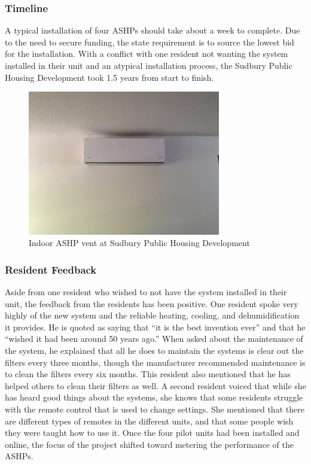 \subsubsection{Timeline}
\par A typical installation of four ASHPs should take about a week to complete. Due to the need to secure funding, the state requirement is to source the lowest bid for the installation. With a conflict with one resident not wanting the system installed in their unit and an atypical installation process, the Sudbury Public Housing Development took 1.5 years from start to finish.
\begin{figure}[H]
\centering
\includegraphics[width=0.75\textwidth]{findingschapter/sudburyinsideunit}
\caption{Indoor ASHP vent at Sudbury Public Housing Development}
\end{figure}

\subsubsection{Resident Feedback}
\par Aside from one resident who wished to not have the system installed in their unit, the feedback from the residents has been positive. One resident spoke very highly of the new system and the reliable heating, cooling, and dehumidification it provides. He is quoted as saying that “it is the best invention ever” and that he “wished it had been around 50 years ago.” When asked about the maintenance of the system, he explained that all he does to maintain the systems is clear out the filters every three months, though the manufacturer recommended maintenance is to clean the filters every six months. This resident also mentioned that he has helped others to clean their filters as well. A second resident voiced that while she has heard good things about the systems, she knows that some residents struggle with the remote control that is used to change settings. She mentioned that there are different types of remotes in the different units, and that some people wish they were taught how to use it. Once the four pilot units had been installed and online, the focus of the project shifted toward metering the performance of the ASHPs.

